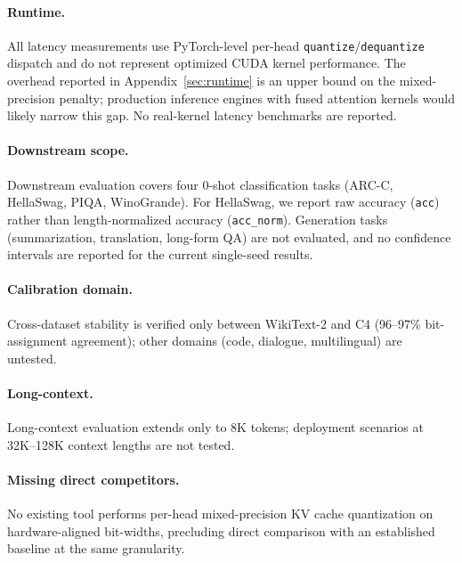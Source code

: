 \paragraph{Runtime.}
All latency measurements use PyTorch-level per-head \texttt{quantize}/\texttt{dequantize} dispatch and do not represent optimized CUDA kernel performance. The overhead reported in Appendix~\ref{sec:runtime} is an upper bound on the mixed-precision penalty; production inference engines with fused attention kernels would likely narrow this gap. No real-kernel latency benchmarks are reported.

\paragraph{Downstream scope.}
Downstream evaluation covers four 0-shot classification tasks (ARC-C, HellaSwag, PIQA, WinoGrande). For HellaSwag, we report raw accuracy (\texttt{acc}) rather than length-normalized accuracy (\texttt{acc\_norm}). Generation tasks (summarization, translation, long-form QA) are not evaluated, and no confidence intervals are reported for the current single-seed results.

\paragraph{Calibration domain.}
Cross-dataset stability is verified only between WikiText-2 and C4 (96--97\% bit-assignment agreement); other domains (code, dialogue, multilingual) are untested.

\paragraph{Long-context.}
Long-context evaluation extends only to 8K tokens; deployment scenarios at 32K--128K context lengths are not tested.

\paragraph{Missing direct competitors.}
No existing tool performs per-head mixed-precision KV cache quantization on hardware-aligned bit-widths, precluding direct comparison with an established baseline at the same granularity.
